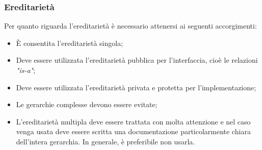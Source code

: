 \documentclass[../NomeDocumento.tex]{subfiles}
\begin{document}
	\subsubsection{Ereditarietà}
	Per quanto riguarda l'ereditarietà è necessario attenersi ai seguenti accorgimenti:
	\begin{itemize}
		\item È consentita l'ereditarietà singola;
		\item Deve essere utilizzata l'ereditarietà pubblica per l'interfaccia, cioè le relazioni \textit{"is-a"};
		\item Deve essere utilizzata l'ereditarietà privata e protetta per l'implementazione; 		
		\item Le gerarchie complesse devono essere evitate;
		\item L'ereditarietà multipla deve essere trattata con molta attenzione e nel caso venga usata deve essere scritta una documentazione particolarmente chiara dell'intera gerarchia. In generale, è preferibile non usarla.
	\end{itemize}
	
\end{document}

